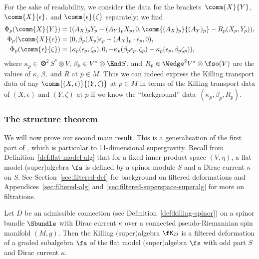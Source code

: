 For the sake of readability, we consider the data for the brackets~$\comm{X}{Y}$, $\comm{X}{\epsilon},$ and $\comm{\epsilon}{\zeta}$ separately; we find
\begin{align}
	\Phi_p(\comm{X}{Y})
		&= ((A_X)_p Y_p - (A_Y)_p X_p,0,\comm{(A_X)_p}{(A_Y)_p} - R_p(X_p,Y_p)),
		\label{eq:phi-p-XY}\\
	\Phi_p(\comm{X}{\epsilon})
		&= (0,\beta_p(X_p)\epsilon_p + (A_X)_p\cdot\epsilon_p,0),
		\label{eq:phi-p-Xepsilon}\\
	\Phi_p(\comm{\epsilon}{\zeta})
		&= (\kappa_p(\epsilon_p,\zeta_p),0,- \kappa_p(\beta_p\epsilon_p,\zeta_p) - \kappa_p(\epsilon_p,\beta_p\zeta_p)),
		\label{eq:phi-p-epsilonzeta}
\end{align}
where $\kappa_p\in\Otimes^2S^*\otimes V$, $\beta_p\in V^*\otimes\End S$, and $R_p\in\Wedge^2V^*\otimes \fso(V)$ are the values of $\kappa$, $\beta,$ and $R$ at $p\in M$. Thus we can indeed express the Killing transport data of any $\comm{(X,\epsilon)}{(Y,\zeta)}$ at $p\in M$ in terms of the Killing transport data of $(X,\epsilon)$ and $(Y,\zeta)$ at $p$ if we know the ``background'' data~$(\kappa_p,\beta_p,R_p)$.

\subsubsection{The structure theorem}

We will now prove our second main result. This is a generalisation of the first part of \cite[Theorem~12]{Figueroa-OFarrill2017_1}, which is particular to 11-dimensional supergravity. Recall from Definition~\ref{def:flat-model-alg} that for a fixed inner product space $(V,\eta)$, a flat model (super)algebra $\fs$ is defined by a spinor module $S$ and a Dirac current $\kappa$ on $S$. See Section~\ref{sec:filtered-def} for background on filtered deformations and Appendices~\ref{sec:filtered-alg} and~\ref{sec:filtered-superspace-superalg} for more on filtrations.

\begin{Theorem}\label{thm:killing-algebra-filtered}
	Let $D$ be an admissible connection $($see Definition~{\rm\ref{def:killing-spinor})} on a spinor bundle $\Sbundle$ with Dirac current $\kappa$ over a connected pseudo-Riemannian spin manifold $(M,g)$. Then the Killing $($super$)$algebra $\fK_D$ is a filtered deformation of a graded subalgebra $\fa$ of the flat model $($super$)$algebra $\fs$ with odd part $S$ and Dirac current $\kappa$.
\end{Theorem}

